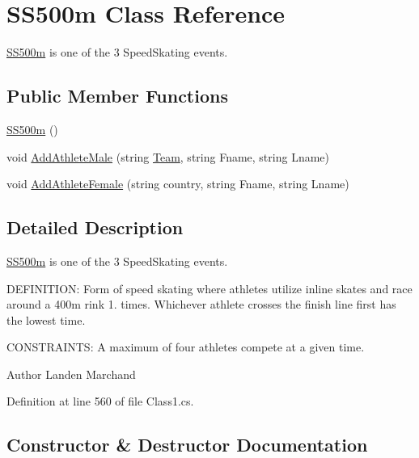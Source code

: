 \hypertarget{classSS500m}{}\section{S\+S500m Class Reference}
\label{classSS500m}


\hyperlink{classSS500m}{S\+S500m} is one of the 3 Speed\+Skating events.  


\subsection*{Public Member Functions}
\begin{DoxyCompactItemize}
\item 
\hyperlink{classSS500m_aaa1286add333a5f9aecc97cf0e65587d}{S\+S500m} ()
\item 
void \hyperlink{classSS500m_a203d2553ba6ae50fc292399aab1920bb}{Add\+Athlete\+Male} (string \hyperlink{classTeam}{Team}, string Fname, string Lname)
\item 
void \hyperlink{classSS500m_a755664a69130dca3b9678aa81f434e93}{Add\+Athlete\+Female} (string country, string Fname, string Lname)
\end{DoxyCompactItemize}


\subsection{Detailed Description}
\hyperlink{classSS500m}{S\+S500m} is one of the 3 Speed\+Skating events. 

D\+E\+F\+I\+N\+I\+T\+I\+ON\+: Form of speed skating where athletes utilize inline skates and race around a 400m rink 1. times. Whichever athlete crosses the finish line first has the lowest time.

C\+O\+N\+S\+T\+R\+A\+I\+N\+TS\+: A maximum of four athletes compete at a given time.\begin{DoxyAuthor}{Author}
Landen Marchand 
\end{DoxyAuthor}


Definition at line 560 of file Class1.\+cs.



\subsection{Constructor \& Destructor Documentation}
\mbox{\label{classSS500m_aaa1286add333a5f9aecc97cf0e65587d}} 
